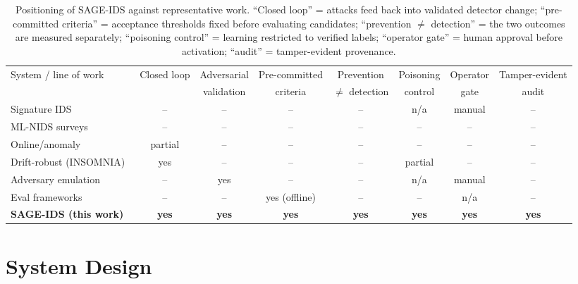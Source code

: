 \documentclass[journal]{IEEEtran}
\newcommand{\sage}{SAGE-IDS}
\begin{document}
\begin{table}[t]
\caption{Positioning of \sage{} against representative work. ``Closed loop'' = attacks feed back into
validated detector change; ``pre-committed criteria'' = acceptance thresholds fixed before evaluating
candidates; ``prevention $\neq$ detection'' = the two outcomes are measured separately; ``poisoning
control'' = learning restricted to verified labels; ``operator gate'' = human approval before
activation; ``audit'' = tamper-evident provenance.}
\label{tab:related}
\centering
\small
\begin{tabular}{@{}lccccccc@{}}
\toprule
System / line of work & Closed loop & Adversarial & Pre-committed & Prevention & Poisoning & Operator & Tamper-evident \\
 & & validation & criteria & $\neq$ detection & control & gate & audit \\
\midrule
Signature IDS~\cite{roesch1999snort,paxson1999bro}        & -- & -- & -- & -- & n/a & manual & -- \\
ML-NIDS surveys~\cite{buczak2016survey}                    & -- & -- & -- & -- & -- & -- & -- \\
Online/anomaly~\cite{mirsky2018kitsune,du2017deeplog}      & partial & -- & -- & -- & -- & -- & -- \\
Drift-robust (INSOMNIA)~\cite{andresini2021insomnia}       & yes & -- & -- & -- & partial & -- & -- \\
Adversary emulation~\cite{applebaum2016caldera}            & -- & yes & -- & -- & n/a & manual & -- \\
Eval frameworks~\cite{pendlebury2019tesseract}             & -- & -- & yes (offline) & -- & -- & n/a & -- \\
\textbf{\sage{} (this work)}                               & \textbf{yes} & \textbf{yes} & \textbf{yes} & \textbf{yes} & \textbf{yes} & \textbf{yes} & \textbf{yes} \\
\bottomrule
\end{tabular}
\end{table}

\section{System Design}
\label{sec:design}
\end{document}
